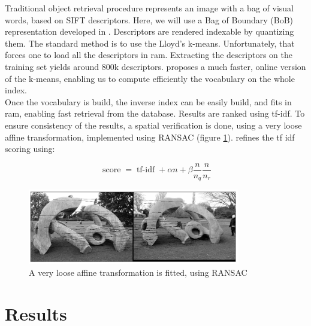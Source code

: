 \documentclass{article}
\DeclareMathOperator{\score}{score}
\DeclareMathOperator{\tfidf}{tf-idf}
\begin{document}
Traditional object retrieval procedure represents an image with a bag of
visual words, based on SIFT descriptors. Here, we will use a Bag of Boundary
(BoB) representation developed in \cite{Arandjelovic11}. Descriptors are
rendered indexable by quantizing them. The standard method is to use the
Lloyd's k-means. Unfortunately, that forces one to load all the descriptors in
ram. Extracting the descriptors on the training set yields around 800k
descriptors. \cite{fast-k-means} proposes a much faster, online version of
the k-means, enabling us to compute efficiently the vocabulary on the whole
index. \\
Once the vocabulary is build, the inverse index can be easily build, and fits
in ram, enabling fast retrieval from the database. Results are ranked using
tf-idf. To ensure consistency of the results, a spatial verification is done,
using a very loose affine transformation, implemented using RANSAC (figure
\ref{ransac}). \cite{Arandjelovic11} refines the tf idf scoring using:

\begin{equation*}
\score = \tfidf + \alpha n + \beta \frac{n}{n_q} \frac{n}{n_r}
\end{equation*}

\begin{figure}
\label{ransac}
\begin{center}
\includegraphics[width=350px]{images/matching_01.png}
\end{center}
\caption{A very loose affine transformation is fitted, using RANSAC}
\end{figure}

\section{Results}
\end{document}
